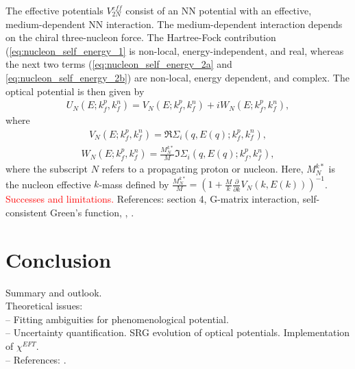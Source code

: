 \documentclass[preprintnumbers,floatfix,aps,prc,preprint,nofootinbib]{revtex4-1}
\begin{document}
The effective potentials $V_{2N}^{eff}$ consist of an NN potential with an effective, medium-dependent NN interaction. The medium-dependent interaction depends on the chiral three-nucleon force. The Hartree-Fock contribution (\ref{eq:nucleon_self_energy_1} is non-local, energy-independent, and real, whereas the next two terms (\ref{eq:nucleon_self_energy_2a} and \ref{eq:nucleon_self_energy_2b}) are non-local, energy dependent, and complex. The optical potential is  then given by
%
\begin{eqnarray}
	\label{eq:nucleon_self_energy_optical_potential}
	U_N(E; k_f^p, k_f^n) = V_N(E; k_f^p, k_f^n) + i W_N(E; k_f^p, k_f^n),
\end{eqnarray}
%
where
\begin{eqnarray}
	\label{eq:nucleon_self_energy_optical_potential_real}
	V_N(E; k_f^p, k_f^n) = \Re \Sigma_i (q, E(q); k_f^p, k_f^n),
\end{eqnarray}
%
\begin{eqnarray}
	\label{eq:nucleon_self_energy_optical_potential_imaginary}
	W_N(E; k_f^p, k_f^n) = \frac{M_N^{k*}}{M} \Im \Sigma_i (q, E(q); k_f^p, k_f^n),
\end{eqnarray}
%
where the subscript $N$ refers to a propagating proton or nucleon. Here, $M_N^{k*}$ is the nucleon effective $k$-mass defined by $\frac{M_N^{k*}}{M} = (1+\frac{M}{k} \frac{\partial}{\partial k} V_N(k, E(k)))^{-1}$.
\\

\textcolor{red}{Successes and limitations.} References: \cite{Dickhoff:2018wdd} section 4, \cite{Furumoto:2019anr} G-matrix interaction, \cite{Idini:2019hkq} self-consistent Green's function, \cite{Rotureau:2016jpf}, \cite{Jeukenne:1977zz}.


\section{Conclusion}
\label{sec:conclusion}


Summary and outlook.
\\
Theoretical issues:
\\
-- Fitting ambiguities for phenomenological potential.
\\
-- Uncertainty quantification. SRG evolution of optical potentials. Implementation of $\chi^{EFT}$.
\\
-- References: \cite{King:2018vzw}.





\end{document}
